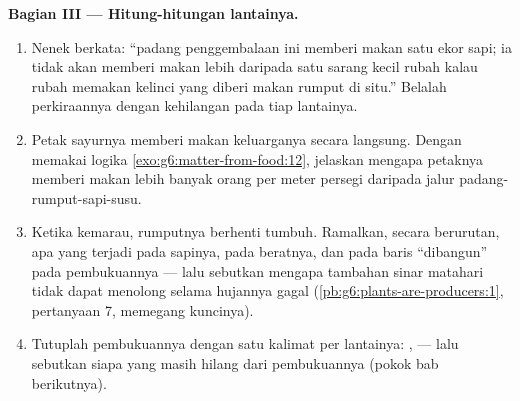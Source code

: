 \begin{problem}
\medskip\noindent\textbf{Bagian III --- Hitung-hitungan
lantainya.}
\begin{enumerate}[resume]
  \item Nenek berkata: ``padang penggembalaan ini memberi makan satu
        ekor sapi; ia tidak akan memberi makan lebih daripada satu
        sarang kecil rubah kalau rubah memakan kelinci yang diberi
        makan rumput di situ.'' Belalah perkiraannya dengan kehilangan
        pada tiap lantainya.
  \item Petak sayurnya memberi makan keluarganya secara langsung.
        Dengan memakai logika \cref{exo:g6:matter-from-food:12},
        jelaskan mengapa petaknya memberi makan lebih banyak orang per
        meter persegi daripada jalur padang-rumput-sapi-susu.
  \item Ketika kemarau, rumputnya berhenti tumbuh. Ramalkan, secara
        berurutan, apa yang terjadi pada  sapinya, pada beratnya,
        dan pada baris ``dibangun'' pada pembukuannya --- lalu sebutkan
        mengapa tambahan sinar matahari tidak dapat menolong selama
        hujannya gagal (\cref{pb:g6:plants-are-producers:1},
        pertanyaan 7, memegang kuncinya).
  \item Tutuplah pembukuannya dengan satu kalimat per lantainya:
        ,  --- lalu sebutkan siapa yang masih hilang
        dari pembukuannya (pokok bab berikutnya).
\end{enumerate}
\end{problem}
